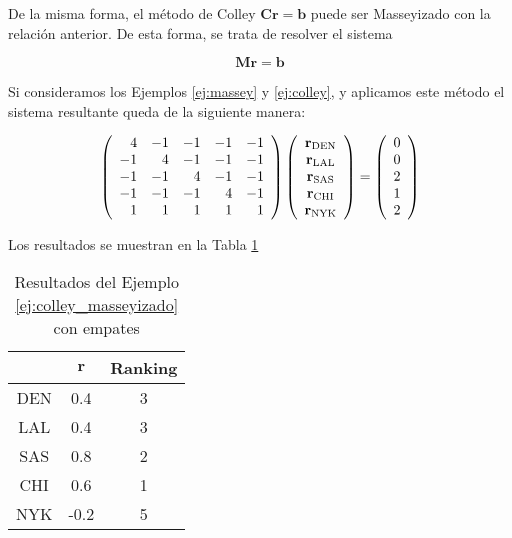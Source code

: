 De la misma forma, el método de Colley $\mathbf{C r} = \mathbf{b}$ puede ser Masseyizado con la relación anterior. De esta forma, se trata de resolver el sistema

\[ \mathbf{M r} = \mathbf{b} \]

\begin{ejemplo}\label{ej:colley_masseyizado}
Si consideramos los Ejemplos \ref{ej:massey} y \ref{ej:colley}, y aplicamos este método el sistema resultante queda de la siguiente manera:

\begin{equation*}
\left(\begin{array}{r r r r r}
 4 & -1 & -1 & -1 & -1\\
-1 &  4 & -1 & -1 & -1\\
-1 & -1 &  4 & -1 & -1\\
-1 & -1 & -1 &  4 & -1\\
 1 &  1 &  1 &  1 &  1
\end{array}\right)
\left(\begin{array}{c}
\mathbf{r}_{\text{DEN}}\\
\mathbf{r}_{\text{LAL}}\\
\mathbf{r}_{\text{SAS}}\\
\mathbf{r}_{\text{CHI}}\\
\mathbf{r}_{\text{NYK}}
\end{array}\right)
=
\left(\begin{array}{c}
0\\
0\\
2\\
1\\
2
\end{array}\right)
\end{equation*}

Los resultados se muestran en la Tabla \ref{tbl:colley_masseyizado}\\

\begin{table}[h]
\centering
\caption{Resultados del Ejemplo \ref{ej:colley_masseyizado} con empates}
\label{tbl:colley_masseyizado}
\begin{tabular}{@{}ccc@{}}
\cmidrule(l){2-3}
    & $\mathbf{r}$ & Ranking \\ \midrule
DEN &  0.4      & 3       \\
LAL &  0.4      & 3       \\
SAS &  0.8      & 2       \\
CHI &  0.6      & 1       \\
NYK & -0.2      & 5       \\ \bottomrule
\end{tabular}
\end{table}


\end{ejemplo}
